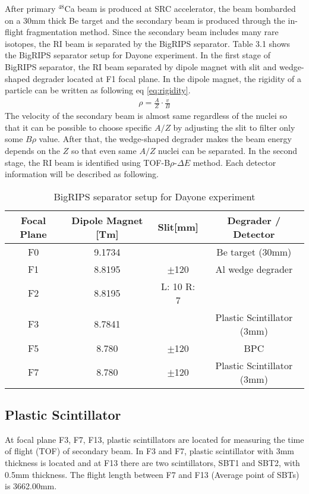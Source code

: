 After primary ${}^{48}$Ca beam is produced at SRC accelerator, the beam bombarded on a 30mm thick Be target and the secondary beam is produced through the in-flight fragmentation method. Since the secondary beam includes many rare isotopes, the RI beam is separated by the BigRIPS separator. Table 3.1 shows the BigRIPS separator setup for Dayone experiment. In the first stage of BigRIPS separator, the RI beam separated by dipole magnet with slit and wedge-shaped degrader located at F1 focal plane. In the dipole magnet, the rigidity of a particle can be written as following eq \ref{eq:rigidity}.
    \begin{align}
        \rho = \frac{A}{Z} \cdot\frac{v}{B} \label{eq:rigidity}
    \end{align}
The velocity of the secondary beam is almost same regardless of the nuclei so that it can be possible to choose specific $A/Z$ by adjusting the slit to filter only some $B\rho$ value. After that, the wedge-shaped degrader makes the beam energy depends on the $Z$ so that even same $A/Z$ nuclei can be separated. In the second stage, the RI beam is identified using TOF-B$\rho$-$\Delta E$ method. Each detector information will be described as following.
    \begin{table}[h]
        \centering
        \begin{tabular}{c c c c}
            \hline
            Focal Plane & Dipole Magnet [Tm] & Slit[mm] & Degrader / Detector \\
            \hline
            F0  & 9.1734 &  & Be target (30mm) \\
            F1  & 8.8195 & $\pm$120 & Al wedge degrader \\
            F2  & 8.8195 & L: 10 R: 7 & \\
            F3  & 8.7841 &  & Plastic Scintillator (3mm)\\
            F5  & 8.780  & $\pm$120 & BPC \\
            F7  & 8.780  & $\pm$120 & Plastic Scintillator (3mm)\\
            \hline
        \end{tabular}
        \caption{BigRIPS separator setup for Dayone experiment \cite{Dayonelog}}
    \end{table}

\subsection{Plastic Scintillator}
At focal plane F3, F7, F13, plastic scintillators are located for measuring the time of flight (TOF) of secondary beam. In F3 and F7, plastic scintillator with 3mm thickness is located and at F13 there are two scintillators, SBT1 and SBT2, with 0.5mm thickness. The flight length between F7 and F13 (Average point of SBTs) is 3662.00mm.


